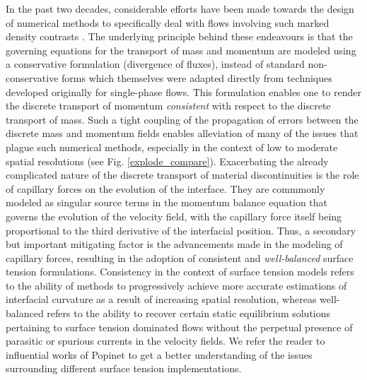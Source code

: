 In the past two decades, considerable efforts have been made 
towards the design of numerical methods to specifically deal with 
flows involving such marked density contrasts
. 
The underlying principle behind these endeavours is that the governing 
equations for the transport of mass and momentum are modeled using a 
conservative formulation (divergence of fluxes), instead of standard 
non-conservative forms which themselves were adapted directly from 
techniques developed originally for single-phase flows. 
This formulation enables one to render the discrete transport of 
momentum \textit{consistent} with respect to the discrete transport of mass.  
Such a tight coupling of the propagation of errors between the discrete 
mass and momentum fields enables alleviation of many of the issues 
that plague such numerical methods, especially in the 
context of low to moderate spatial resolutions (see Fig. \ref{explode_compare}). 
Exacerbating the already complicated nature of the discrete transport of material 
discontinuities is the role of capillary forces on the evolution of the interface. 
They are commmonly modeled as singular source terms in the momentum balance equation that 
governs the evolution of the velocity field, with the capillary force itself 
being proportional to the third derivative of the interfacial position. 
Thus, a secondary but important mitigating factor is the advancements 
made in the modeling of capillary forces, resulting in the adoption of 
consistent and \textit{well-balanced} surface tension formulations.
Consistency in the context of surface tension models refers to the ability 
of methods to progressively achieve more accurate estimations of interfacial 
curvature as a result of increasing spatial resolution, 
whereas well-balanced refers to the ability to recover certain static 
equilibrium solutions pertaining to surface tension dominated flows 
without the perpetual presence of parasitic or spurious currents in the velocity fields.
We refer the reader to influential works of Popinet \cite{popinet2018numerical,popinet2009accurate}
to get a better understanding of the issues surrounding different surface tension implementations.  




